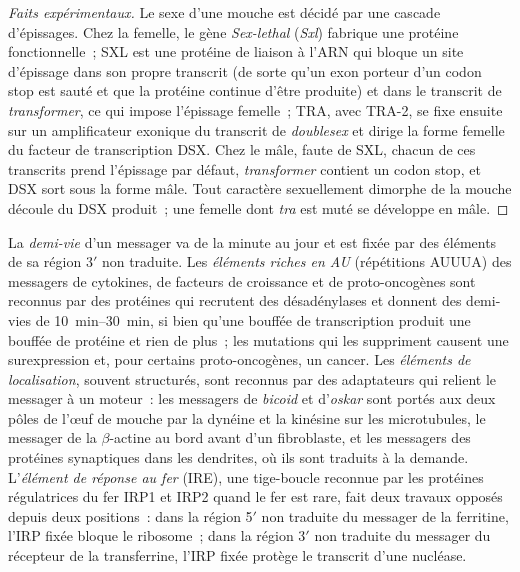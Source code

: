 \begin{proof}[Faits expérimentaux]
Le sexe d'une mouche est décidé par une cascade d'épissages. Chez la
femelle, le gène \emph{Sex-lethal} (\emph{Sxl}) fabrique une protéine
fonctionnelle~; SXL est une protéine de liaison à l'ARN qui bloque un
site d'épissage dans son propre transcrit (de sorte qu'un exon porteur
d'un codon stop est sauté et que la protéine continue d'être produite)
et dans le transcrit de \emph{transformer}, ce qui impose l'épissage
femelle~; TRA, avec TRA-2, se fixe ensuite sur un amplificateur exonique
du transcrit de \emph{doublesex} et dirige la forme femelle du facteur
de transcription DSX. Chez le mâle, faute de SXL, chacun de ces
transcrits prend l'épissage par défaut, \emph{transformer} contient un
codon stop, et DSX sort sous la forme mâle. Tout caractère sexuellement
dimorphe de la mouche découle du DSX produit~; une femelle dont
\emph{tra} est muté se développe en mâle.
\end{proof}

\begin{definition}\label{def:b3:rna-regulation:stability}
La \emph{demi-vie} d'un messager va de la minute au jour et est fixée
par des éléments de sa région 3$'$ non traduite. Les \emph{éléments
riches en AU} (répétitions AUUUA) des messagers de cytokines, de
facteurs de croissance et de proto-oncogènes sont reconnus par des
protéines qui recrutent des désadénylases et donnent des demi-vies de
\qtyrange{10}{30}{min}, si bien qu'une bouffée de transcription produit
une bouffée de protéine et rien de plus~; les mutations qui les
suppriment causent une surexpression et, pour certains
proto-oncogènes, un cancer. Les \emph{éléments de localisation},
souvent structurés, sont reconnus par des adaptateurs qui relient le
messager à un moteur~: les messagers de \emph{bicoid} et d'\emph{oskar}
sont portés aux deux pôles de l'œuf de mouche par la dynéine et la
kinésine sur les microtubules, le messager de la $\beta$-actine au bord
avant d'un fibroblaste, et les messagers des protéines synaptiques dans
les dendrites, où ils sont traduits à la demande. L'\emph{élément de
réponse au fer} (IRE), une tige-boucle reconnue par les protéines
régulatrices du fer IRP1 et IRP2 quand le fer est rare, fait deux
travaux opposés depuis deux positions~: dans la région 5$'$ non
traduite du messager de la ferritine, l'IRP fixée bloque le ribosome~;
dans la région 3$'$ non traduite du messager du récepteur de la
transferrine, l'IRP fixée protège le transcrit d'une nucléase.
\end{definition}

